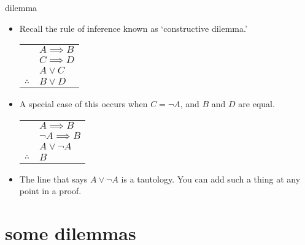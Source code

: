 \documentclass[landscape]{beamer}
\begin{document}
\begin{frame}{dilemma}
\begin{itemize}
\item Recall the rule of inference known as `constructive dilemma.' \pause

\begin{center}
\begin{tabular}{cl}
 & $A \implies B$ \\
 & $C \implies D$ \\ 
 & $A \lor C$ \\ \hline
$\therefore$ & $B \lor D$ \\
\end{tabular}
\end{center}
\pause

\item A special case of this occurs when $C = \lnot A$, and $B$ and $D$ are equal. \pause

\begin{center}
\begin{tabular}{cl}
 & $A \implies B$ \\
 & $\lnot A \implies B$ \\ 
 & $A \lor \lnot A$ \\ \hline
$\therefore$ & $B$ \\
\end{tabular}
\end{center}
\pause

\item The line that says $A \lor \lnot A$ is a tautology. \pause You can add such a thing at any point in a proof.
\end{itemize}
\end{frame}

\section{some dilemmas}
\end{document}
